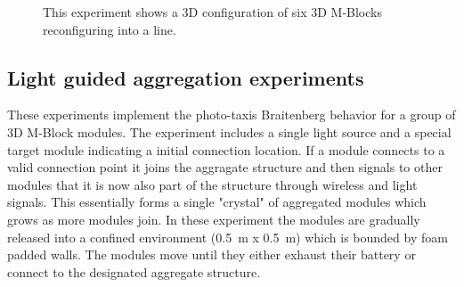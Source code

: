 \begin{figure}[h]
\begin{subfigure}[b]{0.32\linewidth}
	\end{subfigure}
	
	\caption{This experiment shows a 3D configuration of six 3D M-Blocks reconfiguring into a line.}
	
	\label{fig:lineExperiment}
\end{figure}

\subsection{Light guided aggregation experiments}
\label{sec:mblocksExperimentsLight}


These experiments implement the photo-taxis Braitenberg behavior for a group of 3D M-Block modules. The experiment includes a single light source and a special target module indicating a initial connection location. If a module connects to a valid connection point it joins the aggragate structure and then signals to other modules that it is now also part of the structure through wireless and light signals. This essentially forms a single "crystal" of aggregated modules which grows as more modules join. In these experiment the modules are gradually released into a confined environment (0.5~m x 0.5~m) which is bounded by foam padded walls. The modules move until they either exhaust their battery or connect to the designated aggregate structure.

